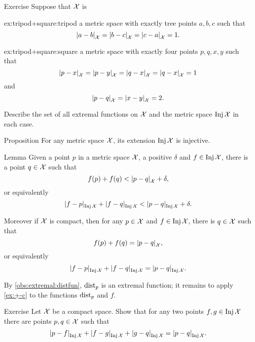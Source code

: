\begin{thm}{Exercise}\label{ex:tripod+square}
Suppose that $\mathcal{X}$ is

\begin{subthm}{ex:tripod+square:tripod} 
a metric space with exactly tree points $a,b,c$ such that 
\[\dist{a}{b}{\spc{X}}=\dist{b}{c}{\spc{X}}=\dist{c}{a}{\spc{X}}=1.\]
\end{subthm}

\begin{subthm}{ex:tripod+square:square}
 a metric space with exactly four points $p,q,x,y$ such that 
\[\dist{p}{x}{\spc{X}}=\dist{p}{y}{\spc{X}}=\dist{q}{x}{\spc{X}}=\dist{q}{x}{\spc{X}}=1\]
and
\[\dist{p}{q}{\spc{X}}=\dist{x}{y}{\spc{X}}=2.\]
\end{subthm}

Describe the set of all extremal functions on $\mathcal{X}$ and the metric space $\mathop{\rm Inj}\nolimits \mathcal{X}$ in each case.
\end{thm}

\begin{thm}{Proposition}\label{prop:InjX-is-injective}
For any metric space $\mathcal{X}$, its extension $\mathop{\rm Inj}\nolimits\mathcal{X}$ is  injective.
\end{thm}

\begin{thm}{Lemma}\label{lem:opposite}
Given a point $p$ in a metric space $\mathcal{X}$, a positive $\delta$ and $f\in \mathop{\rm Inj}\nolimits\mathcal{X}$, there is a point $q\in \mathcal{X}$
such that 
\[f(p)+f(q)<\dist{p}{q}{\spc{X}}+\delta,\]
or equivalently 
\[\dist{f}{p}{\Inj\spc{X}}+\dist{f}{q}{\Inj\spc{X}}<\dist{p}{q}{\Inj\spc{X}}+\delta.\]

Moreover if $\mathcal{X}$ is compact, then for any $p\in\mathcal{X}$ and $f\in \mathop{\rm Inj}\nolimits\mathcal{X}$, there is $q\in \mathcal{X}$ such that 
\[f(p)+f(q)=\dist{p}{q}{\spc{X}},\]
or equivalently 
\[\dist{f}{p}{\Inj\spc{X}}+\dist{f}{q}{\Inj\spc{X}}=\dist{p}{q}{\Inj\spc{X}}.\]
\end{thm}

By \ref{obs:extremal:distfun}, $\mathrm{dist}_p$ is an extremal function;
it remains to apply \ref{ex:+-c} to the functions $\mathrm{dist}_p$ and $f$.
\qeds

\begin{thm}{Exercise}\label{ex:4-on-a-line}
Let $\mathcal{X}$ be a compact space.
Show that for any two points $f,g\in\mathop{\rm Inj}\nolimits \mathcal{X}$ there are points $p,q\in \mathcal{X}$
such that 
\[\dist{p}{f}{\Inj\spc{X}}+\dist{f}{g}{\Inj\spc{X}}+\dist{g}{q}{\Inj\spc{X}}=\dist{p}{q}{\Inj\spc{X}}.\]
\end{thm}


